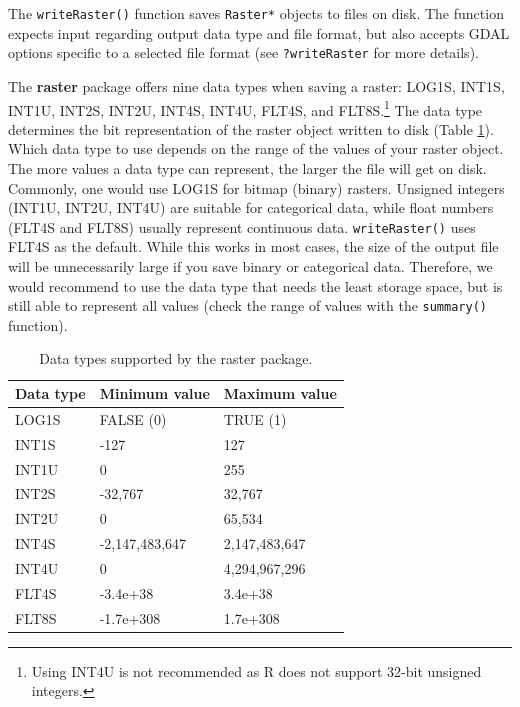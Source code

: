 \documentclass[]{krantz}
\let\rmarkdownfootnote\footnote%
\def\footnote{\protect\rmarkdownfootnote}
\begin{document}
The \texttt{writeRaster()} function saves \texttt{Raster*} objects to files on disk.
The function expects input regarding output data type and file format, but also accepts GDAL options specific to a selected file format (see \texttt{?writeRaster} for more details).

The \textbf{raster} package offers nine data types when saving a raster: LOG1S, INT1S, INT1U, INT2S, INT2U, INT4S, INT4U, FLT4S, and FLT8S.\footnote{Using INT4U is not recommended as R does not support 32-bit unsigned integers.}
The data type determines the bit representation of the raster object written to disk (Table \ref{tab:datatypes}).
Which data type to use depends on the range of the values of your raster object.
The more values a data type can represent, the larger the file will get on disk.
Commonly, one would use LOG1S for bitmap (binary) rasters.
Unsigned integers (INT1U, INT2U, INT4U) are suitable for categorical data, while float numbers (FLT4S and FLT8S) usually represent continuous data.
\texttt{writeRaster()} uses FLT4S as the default.
While this works in most cases, the size of the output file will be unnecessarily large if you save binary or categorical data.
Therefore, we would recommend to use the data type that needs the least storage space, but is still able to represent all values (check the range of values with the \texttt{summary()} function).

\begin{table}[t]

\caption[Data types supported by the raster package.]{\label{tab:datatypes}Data types supported by the raster package.}
\centering
\begin{tabular}{lll}
\toprule
Data type & Minimum value & Maximum value\\
\midrule
LOG1S & FALSE (0) & TRUE (1)\\
INT1S & -127 & 127\\
INT1U & 0 & 255\\
INT2S & -32,767 & 32,767\\
INT2U & 0 & 65,534\\
\addlinespace
INT4S & -2,147,483,647 & 2,147,483,647\\
INT4U & 0 & 4,294,967,296\\
FLT4S & -3.4e+38 & 3.4e+38\\
FLT8S & -1.7e+308 & 1.7e+308\\
\bottomrule
\end{tabular}
\end{table}
\end{document}
